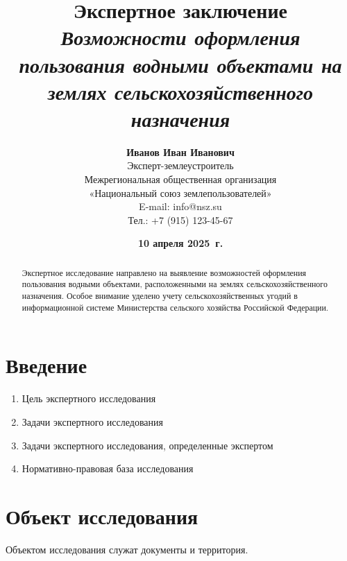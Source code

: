 \title{
    \LARGE\textbf{Экспертное заключение} \\
    \large\textit{Возможности оформления пользования водными объектами на землях сельскохозяйственного назначения}
}

\author{
    \small\textbf{Иванов Иван Иванович} \\[4pt]
    \footnotesize Эксперт-землеустроитель \\
    \footnotesize Межрегиональная общественная организация \\
    \footnotesize «Национальный союз землепользователей» \\
    \footnotesize {E-mail: info@nsz.su} \\
    \footnotesize {Тел.: +7 (915) 123-45-67}
}

\date{
    \small\textbf{10 апреля 2025~г.} \\[4pt]
}

\pagestyle{fancy}
\maketitle

\begin{abstract}
Экспертное исследование направлено на выявление возможностей оформления пользования водными объектами, расположенными на землях сельскохозяйственного назначения. Особое внимание уделено учету сельскохозяйственных угодий в информационной системе Министерства сельского хозяйства Российской Федерации. 
\end{abstract}

\tableofcontents

\section{Введение}
\label{sec:intro}

\begin{enumerate}
    \item[] Цель экспертного исследования
    \item[] Задачи экспертного исследования
    \item[] Задачи экспертного исследования, определенные экспертом 
    \item[] Нормативно-правовая база исследования
\end{enumerate}

\section{Объект исследования}
\label{sec:obj}
Объектом исследования служат документы и территория. 


